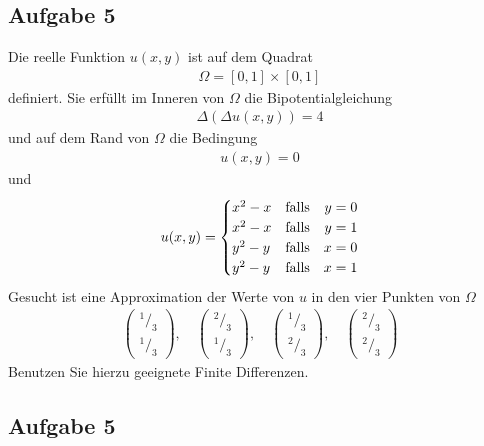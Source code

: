 \documentclass[
	final,
	a4paper,
	oneside,
	parskip=full,
	headings=standardclasses,
	headings=big,
	pointednumbers
]{scrartcl}
\begin{document}
    \subsection*{Aufgabe 5}
    Die reelle Funktion $u{\left(x,  y\right)}$ ist auf dem Quadrat
    \begin{align*}
        \Omega = \left[ 0, 1 \right] \times \left[ 0, 1 \right]
    \end{align*}
    definiert. Sie erfüllt im Inneren von $\Omega$ die Bipotentialgleichung
    \begin{align*}
        \Delta{\left( \Delta u{\left(x,  y\right)} \right)} = 4
    \end{align*}
    und auf dem Rand von $\Omega$ die Bedingung
    \begin{align*}
        u{\left(x,  y\right)} = 0
    \end{align*}
    und
    \begin{align*}
        u{\left(x,  y\right)} =
        \setlength{\arraycolsep}{0pt}
        \renewcommand{\arraystretch}{1.2}
        \left\{
            \begin{array}{l @{\quad} l r l}
                x^2-x & \text{falls\quad} & y &{}= 0 \\
                x^2-x & \text{falls\quad} & y &{}= 1 \\
                y^2-y & \text{falls\quad} & x &{}= 0 \\
                y^2-y & \text{falls\quad} & x &{}= 1
            \end{array}
        \right.
    \end{align*}
    Gesucht ist eine Approximation der Werte von $u$ in den vier Punkten von $\Omega$
    \begin{align*}
        \begin{pmatrix}
            ^1/_3 \\
            ^1/_3
        \end{pmatrix},\quad
        \begin{pmatrix}
            ^2/_3 \\
            ^1/_3
        \end{pmatrix},\quad
        \begin{pmatrix}
            ^1/_3 \\
            ^2/_3
        \end{pmatrix},\quad
        \begin{pmatrix}
            ^2/_3 \\
            ^2/_3
        \end{pmatrix}
    \end{align*}
    Benutzen Sie hierzu geeignete Finite Differenzen.

    \subsection*{Aufgabe 5}
\end{document}
